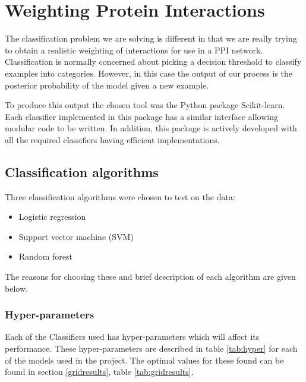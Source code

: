 \section{Weighting Protein Interactions}

The classification problem we are solving is different in that we are really trying to obtain a realistic weighting of interactions for use in a PPI network.
Classification is normally concerned about picking a decision threshold to classify examples into categories.
However, in this case the output of our process is the posterior probability of the model given a new example.

To produce this output the chosen tool was the Python package Scikit-learn\autocite{pedregosa_scikit-learn:_2011}.
Each classifier implemented in this package has a similar interface allowing modular code to be written.
In addition, this package is actively developed with all the required classifiers having efficient implementations.

\subsection{Classification algorithms}

Three classification algorithms were chosen to test on the data:

\begin{itemize}
    \item Logistic regression
    \item Support vector machine (SVM)
    \item Random forest
\end{itemize}

The reasons for choosing these and brief description of each algorithm are given below.

\subsubsection*{Hyper-parameters}
Each of the Classifiers used has hyper-parameters which will affect its performance.
These hyper-parameters are described in table \ref{tab:hyper} for each of the models used in the project.
The optimal values for these found can be found in section \ref{gridresults}, table \ref{tab:gridresults}.

